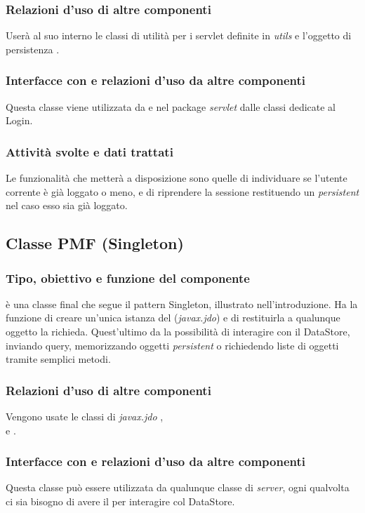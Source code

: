 \subsubsection*{Relazioni d'uso di altre componenti}
User\`a al suo interno le classi di utilit\`a per i servlet definite in
\emph{utils} e l'oggetto di persistenza .

\subsubsection*{Interfacce con e relazioni d'uso da altre componenti}
Questa classe viene utilizzata da  e nel package
\emph{servlet} dalle classi dedicate al Login.

\subsubsection*{Attivit\`a svolte e dati trattati}
Le funzionalit\`a che metter\`a a disposizione sono quelle di individuare se
l'utente corrente \`e gi\`a loggato o meno, e di riprendere la
sessione restituendo un \emph{persistent}  nel caso esso sia
gi\`a loggato.

\subsection{Classe PMF (Singleton)}
\subsubsection*{Tipo, obiettivo e funzione del componente}
 \`e una classe final che segue il pattern Singleton, illustrato
nell'introduzione. Ha la funzione di creare un'unica istanza del
 (\emph{javax.jdo}) e di restituirla a qualunque
oggetto la richieda. Quest'ultimo da la possibilit\`a di interagire con il
DataStore, inviando query, memorizzando oggetti \emph{persistent} o richiedendo liste di oggetti
tramite semplici metodi.

\subsubsection*{Relazioni d'uso di altre componenti}
Vengono usate le classi di \emph{javax.jdo} ,
\\ e .

\subsubsection*{Interfacce con e relazioni d'uso da altre componenti}
Questa classe pu\`o essere utilizzata da qualunque classe di \emph{server}, ogni
qualvolta ci sia bisogno di avere il  per interagire col
DataStore.

